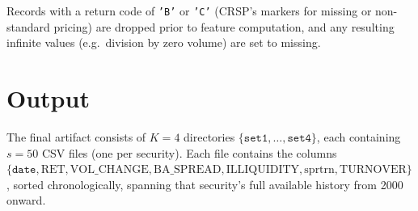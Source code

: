 \documentclass[11pt]{article}
\begin{document}
Records with a return code of \texttt{'B'} or \texttt{'C'} (CRSP's markers
for missing or non-standard pricing) are dropped prior to feature
computation, and any resulting infinite values (e.g.\ division by zero
volume) are set to missing.

\section{Output}

The final artifact consists of $K=4$ directories
$\{\texttt{set1},\dots,\texttt{set4}\}$, each containing $s=50$ CSV files
(one per security). Each file contains the columns
$\{\texttt{date}, \text{RET}, \text{VOL\_CHANGE}, \text{BA\_SPREAD},
\text{ILLIQUIDITY}, \text{sprtrn}, \text{TURNOVER}\}$, sorted
chronologically, spanning that security's full available history from
2000 onward.
\end{document}
